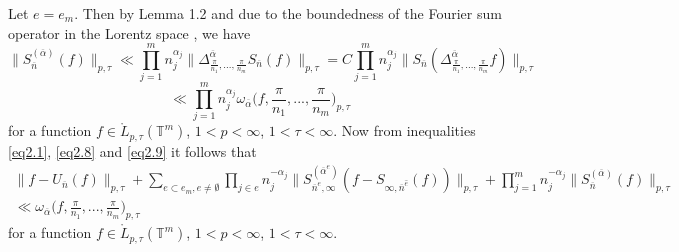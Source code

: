 \documentclass[12pt]{article}
\theoremstyle{plain}
\begin{document}
Let $e=e_{m}$. Then by Lemma 1.2 and due to the boundedness of the Fourier sum operator in the Lorentz space \cite{4}, we have
\begin{equation*} 
\|S_{\overline{n}}^{(\overline{\alpha})}(f)\|_{p, \tau}\ll \prod_{j=1}^{m}n_{j}^{\alpha_{j}}\|\Delta_{\frac{\pi}{n_{1}},...,\frac{\pi}{n_{m}}}^{\overline{\alpha}}S_{\overline{n}}(f)\|_{p, \tau}
=C\prod_{j=1}^{m}n_{j}^{\alpha_{j}}\|S_{\overline{n}}(\Delta_{\frac{\pi}{n_{1}},...,\frac{\pi}{n_{m}}}^{\overline{\alpha}}f)\|_{p, \tau}
\end{equation*}
\begin{equation}\label{eq2.9}
\ll \prod_{j=1}^{m}n_{j}^{\alpha_{j}}\omega_{\overline\alpha}\bigl(f,\frac{\pi}{n_{1}},...,\frac{\pi}{n_{m}}\bigr)_{p, \tau}
\end{equation}
for a function 
 $f\in {\mathring L}_{p, \tau}(\mathbb{T}^{m})$, $1< p<\infty$, $1< \tau < \infty$.
Now from inequalities \eqref{eq2.1}, \eqref{eq2.8} and \eqref{eq2.9} it follows that
 \begin{equation}\label{eq2.10}
 \begin{gathered}
 \|f - U_{\overline{n}} (f)\|_{p, \tau} + \sum_{e\subset e_{m}, e\neq \emptyset} \prod_{j\in e}n_{j}^{-\alpha_{j}} \|S_{\overline{n}^{e}, \infty}^{(\overline{\alpha}^{e})}(f-S_{\infty, \overline{n}^{\hat{e}}}(f))\|_{p, \tau} + \prod_{j=1}^{m}n_{j}^{-\alpha_{j}}\|S_{\overline{n}}^{(\overline{\alpha})}(f)\|_{p, \tau}
\\
\ll \omega_{\overline\alpha}\bigl(f,\frac{\pi}{n_{1}},...,\frac{\pi}{n_{m}}\bigr)_{p, \tau} 
\end{gathered}
\end{equation}
for a function 
 $f\in {\mathring L}_{p, \tau}(\mathbb{T}^{m})$, $1< p<\infty$, $1< \tau < \infty$.
\end{document}
